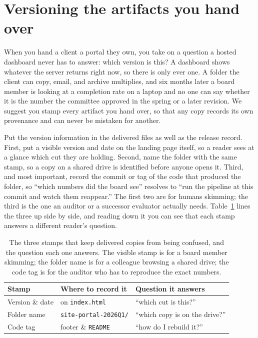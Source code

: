 \documentclass[
    a4paper,
    fontsize=10pt,
    twoside=true,
    numbers=noenddot,
]{kaobook}
\begin{document}
\section{Versioning the artifacts you hand over}\label{sec:versioning}
When you hand a client a portal they own, you take on a question a hosted dashboard never has to answer: which version is this? A dashboard shows whatever the server returns right now, so there is only ever one. A folder the client can copy, email, and archive multiplies, and six months later a board member is looking at a completion rate on a laptop and no one can say whether it is the number the committee approved in the spring or a later revision. We suggest you stamp every artifact you hand over, so that any copy records its own provenance and can never be mistaken for another.

Put the version information in the delivered files as well as the release record. First, put a visible version and date on the landing page itself, so a reader sees at a glance which cut they are holding. Second, name the folder with the same stamp, so a copy on a shared drive is identified before anyone opens it. Third, and most important, record the commit or tag of the code that produced the folder, so \enquote{which numbers did the board see} resolves to \enquote{run the pipeline at this commit and watch them reappear.} The first two are for humans skimming; the third is the one an auditor or a successor evaluator actually needs. Table~\ref{tab:stamps} lines the three up side by side, and reading down it you can see that each stamp answers a different reader's question.

\begin{table}[htbp]
\centering
\footnotesize
\caption[What to stamp on a delivered portal]{The three stamps that keep delivered copies from being confused, and the question each one answers. The visible stamp is for a board member skimming; the folder name is for a colleague browsing a shared drive; the code tag is for the auditor who has to reproduce the exact numbers.}
\label{tab:stamps}
\begin{tabular}{lll}
\hline
Stamp & Where to record it & Question it answers \\
\hline
Version \& date & on \texttt{index.html} & \enquote{which cut is this?} \\
Folder name     & \texttt{site-portal-2026Q1/} & \enquote{which copy is on the drive?} \\
Code tag        & footer \& \texttt{README} & \enquote{how do I rebuild it?} \\
\hline
\end{tabular}
\end{table}
\end{document}
